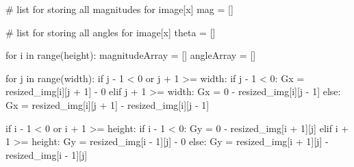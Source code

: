 \documentclass[
  letterpaper,
  DIV=11,
  numbers=noendperiod]{scrreprt}
\newenvironment{Shaded}{\begin{snugshade}}{\end{snugshade}}
\newcommand{\BuiltInTok}[1]{\textcolor[rgb]{0.00,0.23,0.31}{#1}}
\newcommand{\CommentTok}[1]{\textcolor[rgb]{0.37,0.37,0.37}{#1}}
\newcommand{\ControlFlowTok}[1]{\textcolor[rgb]{0.00,0.23,0.31}{#1}}
\newcommand{\DecValTok}[1]{\textcolor[rgb]{0.68,0.00,0.00}{#1}}
\newcommand{\KeywordTok}[1]{\textcolor[rgb]{0.00,0.23,0.31}{#1}}
\newcommand{\NormalTok}[1]{\textcolor[rgb]{0.00,0.23,0.31}{#1}}
\newcommand{\OperatorTok}[1]{\textcolor[rgb]{0.37,0.37,0.37}{#1}}
\begin{document}
\begin{Shaded}
\begin{Highlighting}[]
    \CommentTok{\# list for storing all magnitudes for image[x]}
\NormalTok{    mag }\OperatorTok{=}\NormalTok{ []}

    \CommentTok{\# list for storing all angles for image[x]}
\NormalTok{    theta }\OperatorTok{=}\NormalTok{ []}

    \ControlFlowTok{for}\NormalTok{ i }\KeywordTok{in} \BuiltInTok{range}\NormalTok{(height):}
\NormalTok{        magnitudeArray }\OperatorTok{=}\NormalTok{ []}
\NormalTok{        angleArray }\OperatorTok{=}\NormalTok{ []}

        \ControlFlowTok{for}\NormalTok{ j }\KeywordTok{in} \BuiltInTok{range}\NormalTok{(width):}
            \ControlFlowTok{if}\NormalTok{ j }\OperatorTok{{-}} \DecValTok{1} \OperatorTok{\textless{}} \DecValTok{0} \KeywordTok{or}\NormalTok{ j }\OperatorTok{+} \DecValTok{1} \OperatorTok{\textgreater{}=}\NormalTok{ width:}
                \ControlFlowTok{if}\NormalTok{ j }\OperatorTok{{-}} \DecValTok{1} \OperatorTok{\textless{}} \DecValTok{0}\NormalTok{:}
\NormalTok{                    Gx }\OperatorTok{=}\NormalTok{ resized\_img[i][j }\OperatorTok{+} \DecValTok{1}\NormalTok{] }\OperatorTok{{-}} \DecValTok{0}
                \ControlFlowTok{elif}\NormalTok{ j }\OperatorTok{+} \DecValTok{1} \OperatorTok{\textgreater{}=}\NormalTok{ width:}
\NormalTok{                    Gx }\OperatorTok{=} \DecValTok{0} \OperatorTok{{-}}\NormalTok{ resized\_img[i][j }\OperatorTok{{-}} \DecValTok{1}\NormalTok{]}
            \ControlFlowTok{else}\NormalTok{:}
\NormalTok{                Gx }\OperatorTok{=}\NormalTok{ resized\_img[i][j }\OperatorTok{+} \DecValTok{1}\NormalTok{] }\OperatorTok{{-}}\NormalTok{ resized\_img[i][j }\OperatorTok{{-}} \DecValTok{1}\NormalTok{]}

            \ControlFlowTok{if}\NormalTok{ i }\OperatorTok{{-}} \DecValTok{1} \OperatorTok{\textless{}} \DecValTok{0} \KeywordTok{or}\NormalTok{ i }\OperatorTok{+} \DecValTok{1} \OperatorTok{\textgreater{}=}\NormalTok{ height:}
                \ControlFlowTok{if}\NormalTok{ i }\OperatorTok{{-}} \DecValTok{1} \OperatorTok{\textless{}} \DecValTok{0}\NormalTok{:}
\NormalTok{                    Gy }\OperatorTok{=} \DecValTok{0} \OperatorTok{{-}}\NormalTok{ resized\_img[i }\OperatorTok{+} \DecValTok{1}\NormalTok{][j]}
                \ControlFlowTok{elif}\NormalTok{ i }\OperatorTok{+} \DecValTok{1} \OperatorTok{\textgreater{}=}\NormalTok{ height:}
\NormalTok{                    Gy }\OperatorTok{=}\NormalTok{ resized\_img[i }\OperatorTok{{-}} \DecValTok{1}\NormalTok{][j] }\OperatorTok{{-}} \DecValTok{0}
            \ControlFlowTok{else}\NormalTok{:}
\NormalTok{                Gy }\OperatorTok{=}\NormalTok{ resized\_img[i }\OperatorTok{+} \DecValTok{1}\NormalTok{][j] }\OperatorTok{{-}}\NormalTok{ resized\_img[i }\OperatorTok{{-}} \DecValTok{1}\NormalTok{][j]}


\end{Highlighting}
\end{Shaded}
\end{document}
